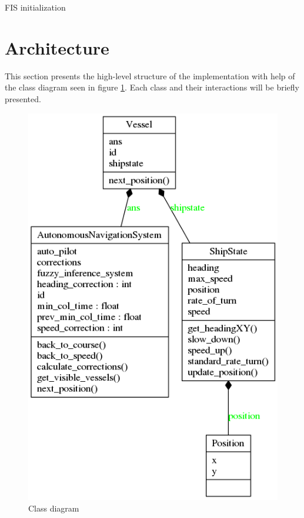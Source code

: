 \begin{listing}[H]
    \inputminted[linenos, breaklines=true,fontsize=\scriptsize, numberblanklines=false]{python}{../src/example.py}
    \caption{FIS initialization}
    \label{listing:fis}
\end{listing}

\section{Architecture}
This section  presents the high-level structure of the implementation with help of the class diagram seen in figure \ref{fig:class_diagram}. Each class and their interactions will be briefly presented.
\begin{figure}[H]
    \centering
    \includegraphics[width=\textwidth,height=0.75\textheight,keepaspectratio]{../src/classes_Pyreverse}
    \caption{Class diagram}
    \label{fig:class_diagram}
\end{figure}
